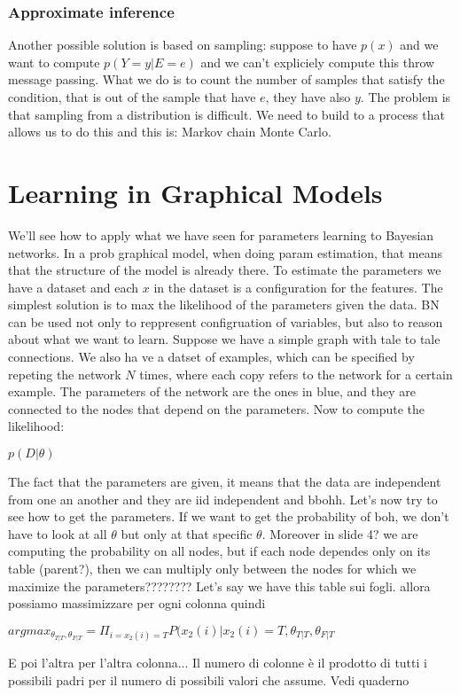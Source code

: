 \subsection{Approximate inference}
Another possible solution is based on sampling: suppose to have $p(x)$ and we want to compute $p(Y=y\vert E=e)$ and we can't expliciely compute this throw message passing. What we do is to count the number of samples that satisfy the condition, that is out of the sample that have $e$, they have also $y$. The problem is that sampling from a distribution is difficult. We need to build to a process that allows us to do this and this is: Markov chain Monte Carlo. 
\chapter{Learning in Graphical Models}
We'll see how to apply what we have seen for parameters learning to Bayesian networks.\newline
In a prob graphical model, when doing param estimation, that means that the structure of the model is already there. To estimate the parameters we have a dataset and each $x$ in the dataset is a configuration for the features. The simplest solution is to max the likelihood of the parameters given the data.\newline
BN can be used not only to reppresent configruation of variables, but also to reason about what we want to learn. Suppose we have a simple graph with tale to tale connections. We also ha ve a datset of examples, which can be specified by repeting the network $N$ times, where each copy refers to the network for a certain example. The parameters of the network are the ones in blue, and they are connected to the nodes that depend on the parameters. Now to compute the likelihood:
\begin{center}
	$\displaystyle p(D\vert \theta)$
\end{center}
The fact that the parameters are given, it means that the data are independent from one an another and they are iid independent and bbohh. \newline
Let's now try to see how to get the parameters. If we want to get the probability of boh, we don't have to look at all $\theta$ but only at that specific $\theta$. Moreover in slide 4? we are computing the probability on all nodes, but if each node dependes only on its table (parent?), then we can multiply only between the nodes for which we maximize the parameters????????
Let's say we have this table sui fogli. allora possiamo massimizzare per ogni colonna quindi
\begin{center}
	$\displaystyle argmax_{\theta_{T\vert T}, \theta_{F\vert T}}=\Pi_{i=x_2(i)=T}P(x_2(i)\vert x_2(i)=T, \theta_{T\vert T}, \theta_{F\vert T}$
\end{center}
E poi l'altra per l'altra colonna... \newline
Il numero di colonne è il prodotto di tutti i possibili padri per il numero di possibili valori che assume. Vedi quaderno 

